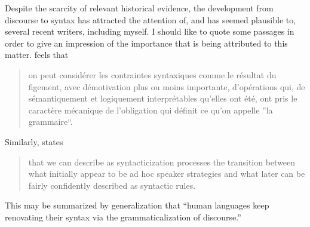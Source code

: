 Despite the scarcity of relevant historical evidence, the development from discourse to syntax has attracted the attention of, and has seemed plausible to, several recent writers, including myself. I should like to quote some passages in order to give an impression of the importance that is being attributed to this matter. \citet[22]{Hagège1978} feels that

\begin{quote} \label{Hagege}
on peut considérer les contraintes syntaxiques comme le résultat du figement, avec démotivation plus ou moins importante, d'opérations qui, de sémantiquement et logiquement interprétables qu'elles ont été, ont pris le caractère mécanique de l'obligation qui définit ce qu'on appelle ”la grammaire“.
\end{quote}

\noindent Similarly, \citet[62]{Sankoff1977} states

\begin{quote}
that we can describe as syntacticization processes the transition between what initially appear to be ad hoc speaker strategies and what later can be fairly confidently described as syntactic rules.
\end{quote}

\noindent This may be summarized by \citet[107]{Givón1979} generalization that “human languages keep renovating their syntax via the grammaticalization of discourse.”


